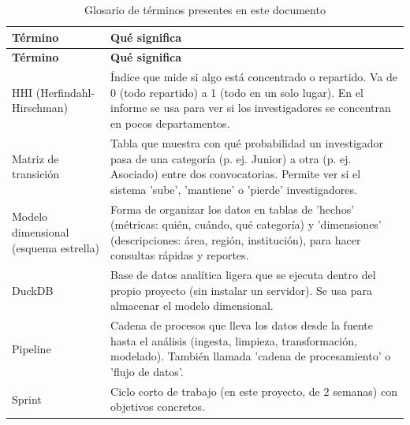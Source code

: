 \begingroup
\small
\setlength{\tabcolsep}{3pt}
\begin{longtable}{>{\raggedright\arraybackslash}p{4.3cm}>{\raggedright\arraybackslash}p{9.8cm}}
\caption{Glosario de términos presentes en este documento}
\label{tab:glosario}\\
\toprule
\textbf{Término} & \textbf{Qué significa} \\
\midrule
\endfirsthead
\toprule
\textbf{Término} & \textbf{Qué significa} \\
\midrule
\endhead
    HHI (Herfindahl-Hirschman) & Índice que mide si algo está concentrado o repartido. Va de 0 (todo repartido) a 1 (todo en un solo lugar). En el informe se usa para ver si los investigadores se concentran en pocos departamentos.
 \\
    Matriz de transición & Tabla que muestra con qué probabilidad un investigador pasa de una categoría (p. ej. Junior) a otra (p. ej. Asociado) entre dos convocatorias. Permite ver si el sistema 'sube', 'mantiene' o 'pierde' investigadores.
 \\
    Modelo dimensional (esquema estrella) & Forma de organizar los datos en tablas de 'hechos' (métricas: quién, cuándo, qué categoría) y 'dimensiones' (descripciones: área, región, institución), para hacer consultas rápidas y reportes.
 \\
    DuckDB & Base de datos analítica ligera que se ejecuta dentro del propio proyecto (sin instalar un servidor). Se usa para almacenar el modelo dimensional.
 \\
    Pipeline & Cadena de procesos que lleva los datos desde la fuente hasta el análisis (ingesta, limpieza, transformación, modelado). También llamada 'cadena de procesamiento' o 'flujo de datos'.
 \\
    Sprint & Ciclo corto de trabajo (en este proyecto, de 2 semanas) con objetivos concretos.
 \\
\bottomrule
\end{longtable}
\endgroup
